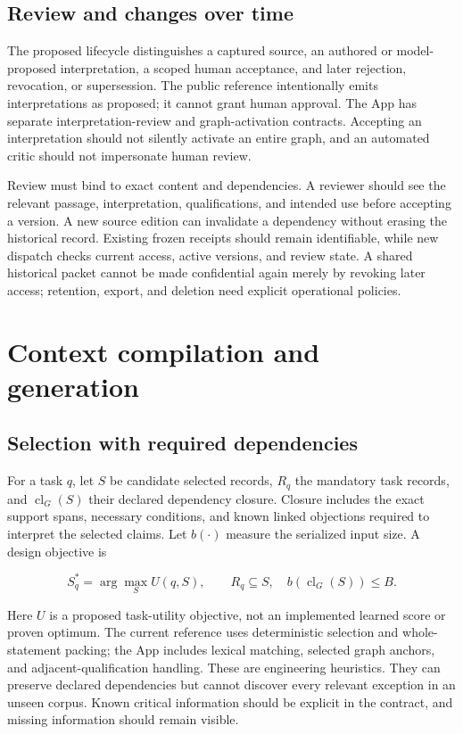 \documentclass[
  11pt,
]{article}
\let\originalsection\section
\renewcommand{\section}{\Needspace{5\baselineskip}\originalsection}
\begin{document}
\subsection{Review and changes over
time}\label{review-and-changes-over-time}

The proposed lifecycle distinguishes a captured source, an authored or
model-proposed interpretation, a scoped human acceptance, and later
rejection, revocation, or supersession. The public reference
intentionally emits interpretations as proposed; it cannot grant human
approval. The App has separate interpretation-review and
graph-activation contracts. Accepting an interpretation should not
silently activate an entire graph, and an automated critic should not
impersonate human review.

Review must bind to exact content and dependencies. A reviewer should
see the relevant passage, interpretation, qualifications, and intended
use before accepting a version. A new source edition can invalidate a
dependency without erasing the historical record. Existing frozen
receipts should remain identifiable, while new dispatch checks current
access, active versions, and review state. A shared historical packet
cannot be made confidential again merely by revoking later access;
retention, export, and deletion need explicit operational policies.

\section{Context compilation and
generation}\label{context-compilation-and-generation}

\subsection{Selection with required
dependencies}\label{selection-with-required-dependencies}

For a task \(q\), let \(S\) be candidate selected records, \(R_q\) the
mandatory task records, and \(\operatorname{cl}_G(S)\) their declared
dependency closure. Closure includes the exact support spans, necessary
conditions, and known linked objections required to interpret the
selected claims. Let \(b(\cdot)\) measure the serialized input size. A
design objective is

\[
S_q^* = \arg\max_S U(q,S),\qquad
R_q\subseteq S,\quad b(\operatorname{cl}_G(S))\leq B.
\]

Here \(U\) is a proposed task-utility objective, not an implemented
learned score or proven optimum. The current reference uses
deterministic selection and whole-statement packing; the App includes
lexical matching, selected graph anchors, and adjacent-qualification
handling. These are engineering heuristics. They can preserve declared
dependencies but cannot discover every relevant exception in an unseen
corpus. Known critical information should be explicit in the contract,
and missing information should remain visible.
\end{document}
